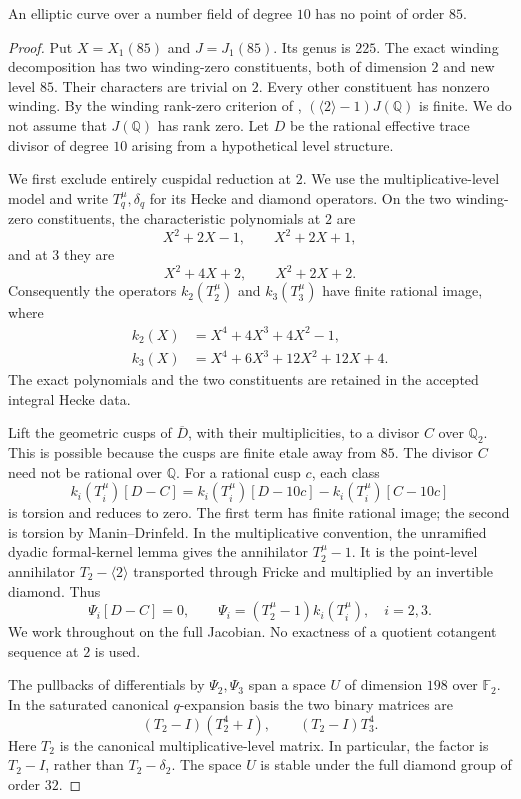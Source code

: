 \begin{proposition}\label{prop:decic-no85}
An elliptic curve over a number field of degree $10$ has no point
of order $85$.
\end{proposition}
\begin{proof}
Put $X=X_1(85)$ and $J=J_1(85)$. Its genus is $225$.
The exact winding decomposition has two winding-zero constituents,
both of dimension $2$ and new level $85$. Their characters are
trivial on $2$. Every other constituent has nonzero winding.
By the winding rank-zero criterion of \cite[Section~3]{DEHMZ},
$(\langle2\rangle-1)J(\mathbb Q)$ is finite. We do not assume
that $J(\mathbb Q)$ has rank zero.
Let $D$ be the rational effective trace divisor of degree $10$
arising from a hypothetical level structure.

We first exclude entirely cuspidal reduction at $2$. We use the
multiplicative-level model and write $T_q^\mu,\delta_q$ for its
Hecke and diamond operators. On the two winding-zero constituents,
the characteristic polynomials at $2$ are
\[
 X^2+2X-1,\qquad X^2+2X+1,
\]
and at $3$ they are
\[
 X^2+4X+2,\qquad X^2+2X+2.
\]
Consequently the operators $k_2(T_2^\mu)$ and $k_3(T_3^\mu)$
have finite rational image, where
\[
 \begin{split}
 k_2(X)&=X^4+4X^3+4X^2-1,\\
 k_3(X)&=X^4+6X^3+12X^2+12X+4.
 \end{split}
\]
The exact polynomials and the two constituents are retained in the
accepted integral Hecke data.

Lift the geometric cusps of $\overline D$, with their multiplicities,
to a divisor $C$ over $\mathbb Q_2$. This is possible because the
cusps are finite etale away from $85$. The divisor $C$ need not be
rational over $\mathbb Q$. For a rational cusp $c$, each class
\[
 k_i(T_i^\mu)[D-C]
 =k_i(T_i^\mu)[D-10c]-k_i(T_i^\mu)[C-10c]
\]
is torsion and reduces to zero. The first term has finite rational
image; the second is torsion by Manin--Drinfeld.
In the multiplicative convention, the unramified dyadic formal-kernel
lemma gives the annihilator $T_2^\mu-1$. It is the point-level
annihilator $T_2-\langle2\rangle$ transported through Fricke and
multiplied by an invertible diamond. Thus
\[
 \Psi_i[D-C]=0,\qquad
 \Psi_i=(T_2^\mu-1)k_i(T_i^\mu),\quad i=2,3.
\]
We work throughout on the full Jacobian. No exactness of a quotient
cotangent sequence at $2$ is used.

The pullbacks of differentials by $\Psi_2,\Psi_3$ span a space $U$
of dimension $198$ over $\mathbb F_2$. In the saturated canonical
$q$-expansion basis the two binary matrices are
\[
 (T_2-I)(T_2^4+I),\qquad (T_2-I)T_3^4.
\]
Here $T_2$ is the canonical multiplicative-level matrix. In particular,
the factor is $T_2-I$, rather than $T_2-\delta_2$.
The space $U$ is stable under the full diamond group of order $32$.


\end{proof}
